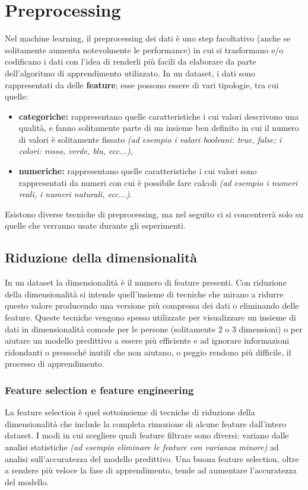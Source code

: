 \documentclass[12pt, twoside, letterpaper]{report}
\begin{document}
		\section{Preprocessing}
			Nel machine learning, il preprocessing dei dati è uno step facoltativo (anche se solitamente aumenta notevolmente le performance) in cui si trasformano e/o codificano i dati con l'idea di renderli più facili da elaborare da parte dell'algoritmo di apprendimento utilizzato. In un dataset, i dati sono rappresentati da delle \textbf{feature}; esse possono essere di vari tipologie, tra cui quelle: 
			
			\begin{itemize}
				\item \textbf{categoriche:} rappresentano quelle caratteristiche i cui valori descrivono una qualità, e fanno solitamente parte di un insieme ben definito in cui il numero di valori è solitamente fissato \textit{(ad esempio i valori booleani: true, false; i colori: rosso, verde, blu, ecc...)},
				\item \textbf{numeriche:} rappresentano quelle caratteristiche i cui valori sono rappresentati da numeri con cui è possibile fare calcoli \textit{(ad esempio i numeri reali, i numeri naturali, ecc...)}.
			\end{itemize}
			Esistono diverse tecniche di preprocessing, ma nel seguito ci si concentrerà solo su quelle che verranno usate durante gli esperimenti.
			
			\subsection{Riduzione della dimensionalità} In un dataset la dimensionalità è il numero di feature presenti. Con riduzione della dimensionalità si intende quell'insieme di tecniche che mirano a ridurre questo valore producendo una versione più compressa dei dati o eliminando delle feature. Queste tecniche vengono spesso utilizzate per visualizzare un insieme di dati in dimensionalità comode per le persone (solitamente 2 o 3 dimensioni) o per aiutare un modello predittivo a essere più efficiente e ad ignorare informazioni ridondanti o pressoché inutili che non aiutano, o peggio rendono più difficile, il processo di apprendimento. 
			
				\subsubsection{Feature selection e feature engineering} La feature selection è quel sottoinsieme di tecniche di riduzione della dimensionalità che include la completa rimozione di alcune feature dall'intero dataset. I modi in cui scegliere quali feature filtrare sono diversi: variano dalle analisi statistiche \textit{(ad esempio eliminare le feature con varianza minore)} ad analisi sull'accuratezza del modello predittivo. Una buona feature selection, oltre a rendere più veloce la fase di apprendimento, tende ad aumentare l'accuratezza del modello. %
				
\end{document}
